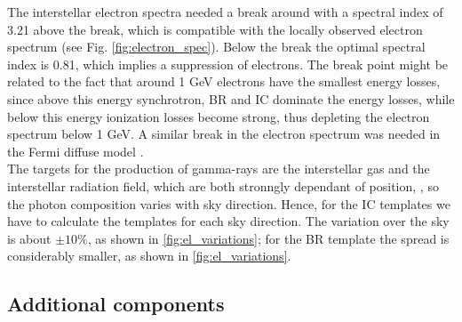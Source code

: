 The interstellar electron spectra needed a break around  with a spectral index of 3.21 above the break, which is compatible with the locally observed electron spectrum (see Fig. \ref{fig:electron_spec}). Below the break the optimal spectral index is 0.81, which implies a suppression of electrons. The break point might be related to the fact that around 1 GeV electrons have the smallest energy losses, since above this energy synchrotron, BR and IC dominate the energy losses, while below this energy ionization losses become strong, thus depleting the electron spectrum below 1 GeV. A similar break in the electron spectrum was needed in the Fermi diffuse model .\\
The targets for the production of gamma-rays are the interstellar gas and the interstellar radiation field, which are both stronngly dependant of position, %
, so the photon composition varies with sky direction. 
Hence, for the IC templates we have to calculate the templates for each sky direction. The variation over the sky is about $\pm 10\%$, as shown in \ref{fig:el_variations}; for the BR template the spread is considerably smaller, as shown in \ref{fig:el_variations}. %






\subsection{Additional components}

